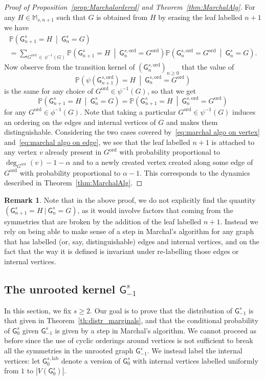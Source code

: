 \documentclass[10pt]{amsart}
\theoremstyle{definition}\newtheorem{defi}[theo]{Definition}\newtheorem{rema}[theo]{Remark}\newtheorem{exam}[theo]{Example}\newtheorem{exem}[theo]{Example}\newtheorem{nota}[theo]{Notation}
\newcommand{\Pp}[1]{\mathbb{P} \left(#1\right)}
\newcommand{\ord}{\mathrm{ord}}
\newcommand{\lab}{\mathrm{lab}}
\newcommand{\sG}{\mathsf{G}}
\newcommand{\M}{\mathbb{M}}
\begin{document}
\begin{proof}[Proof of Proposition~\ref{prop:Marchalordered} and Theorem~\ref{thm:MarchalAlg}]
For any $H\in \M_{s,n+1}$ such that $G$ is obtained from $H$ by erasing the leaf labelled $n+1$ we have
\begin{multline}\label{eq:formule_probas_totales}
\Pp{\sG^s_{n+1}=H\ \middle|\ \sG^s_{n}=G}\\
=\sum_{G^{\ord}\,\in\,\psi^{-1}(G)}\Pp{\sG^s_{n+1}=H\ \middle|\ \sG^{s,\ord}_{n}=G^{\ord}} \Pp{\sG^{s,\ord}_{n}=G^{\ord} \ \middle|\ \sG^s_{n}=G}.
\end{multline}
Now observe from the transition kernel of $(\sG^{s,\ord}_{n})_{n\geq 0}$ that the value of 
\[
\Pp{\psi\left(\sG^{s,\ord}_{n+1}\right)=H\ \middle|\ \sG^{s,\ord}_{n}=G^{\ord}}
\]
is the same for any choice of $G^{\ord} \in \psi^{-1}(G)$, so that we get
\[
\Pp{\sG^s_{n+1}=H\ \middle|\ \sG^s_{n}=G}=\Pp{\sG^s_{n+1}=H\ \middle|\ \sG^{s,\ord}_{n}=G^{\ord}}
\]
for any $G^{\ord} \in \phi^{-1}(G)$. Note that taking a particular $G^{\ord} \in \psi^{-1}(G)$ induces an ordering on the edges and internal vertices of $G$ and makes them distinguishable. Considering the two cases covered by~\eqref{eq:marchal algo on vertex} and~\eqref{eq:marchal algo on edge}, we see that the leaf labelled $n+1$ is attached to any vertex $v$ already present in $G^\ord$ with probability proportional to $\deg_{G^{\ord}}(v) -1-\alpha$ and to a newly created vertex created along some edge of $G^\ord$ with probability proportional to $\alpha -1$. This corresponds to the dynamics described in Theorem~\ref{thm:MarchalAlg}.
\end{proof}


\begin{rema}
Note that in the above proof, we do not explicitly find the quantity $(\sG^s_{n+1}=H\ |\ \sG^s_{n}=G)$, as it would involve factors that coming from the symmetries that are broken by the addition of the leaf labelled $n+1$. Instead we rely on being able to make sense of a step in Marchal's algorithm for any graph that has labelled (or, say, distinguishable) edges and internal vertices, and on the fact that the way it is defined is invariant under re-labelling those edges or internal vertices.
\end{rema}


\subsection{The unrooted kernel \texorpdfstring{$\sG_{-1}^s$}{mathsf G-1s}}\label{sec:unrooted}

In this section, we fix $s \geq 2$. Our goal is to prove that the distribution of $\sG_{-1}^s$ is that given in Theorem~\ref{th:distr_marginals}, and that the conditional probability of $\sG_{0}^s$ given $\sG_{-1}^s$ is given by a step in Marchal's algorithm. We cannot proceed as before since the use of cyclic orderings around vertices is not sufficient to break all the symmetries in the unrooted graph $\sG^{s}_{-1}$. We instead label the internal vertices: let $\sG_{0}^{s,\lab}$ denote a version of $\sG^s_0$ with internal vertices labelled uniformly from $1$ to $|V(\sG^s_0)|$.
\end{document}
